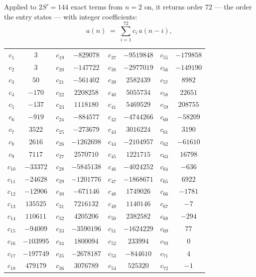 \documentclass[11pt,a4paper]{article}
\theoremstyle{plain}
\theoremstyle{definition}
\begin{document}
Applied to $2S'=144$ exact terms from $n=2$ on, it returns order $72$ --- the
order the entry states --- with integer coefficients:
\[
a(n)\;=\;\sum_{i=1}^{72}c_i\,a(n-i),
\]
\begin{center}\small
\begin{tabular}{cccccccc}
$c_{1}$ & $3$ & $c_{19}$ & $-829078$ & $c_{37}$ & $-9519848$ & $c_{55}$ & $-179858$ \\
$c_{2}$ & $3$ & $c_{20}$ & $-147722$ & $c_{38}$ & $-2977019$ & $c_{56}$ & $-149190$ \\
$c_{3}$ & $50$ & $c_{21}$ & $-561402$ & $c_{39}$ & $2582439$ & $c_{57}$ & $8982$ \\
$c_{4}$ & $-170$ & $c_{22}$ & $2208258$ & $c_{40}$ & $5055734$ & $c_{58}$ & $22651$ \\
$c_{5}$ & $-137$ & $c_{23}$ & $1118180$ & $c_{41}$ & $5469529$ & $c_{59}$ & $208755$ \\
$c_{6}$ & $-919$ & $c_{24}$ & $-884577$ & $c_{42}$ & $-4744266$ & $c_{60}$ & $-58209$ \\
$c_{7}$ & $3522$ & $c_{25}$ & $-273679$ & $c_{43}$ & $3016224$ & $c_{61}$ & $3190$ \\
$c_{8}$ & $2616$ & $c_{26}$ & $-1262698$ & $c_{44}$ & $-2104957$ & $c_{62}$ & $-61610$ \\
$c_{9}$ & $7117$ & $c_{27}$ & $2570710$ & $c_{45}$ & $1221715$ & $c_{63}$ & $16798$ \\
$c_{10}$ & $-33372$ & $c_{28}$ & $-5845138$ & $c_{46}$ & $-4024252$ & $c_{64}$ & $-636$ \\
$c_{11}$ & $-24628$ & $c_{29}$ & $-1201776$ & $c_{47}$ & $-1868671$ & $c_{65}$ & $6922$ \\
$c_{12}$ & $-12906$ & $c_{30}$ & $-671146$ & $c_{48}$ & $1749026$ & $c_{66}$ & $-1781$ \\
$c_{13}$ & $135525$ & $c_{31}$ & $7216132$ & $c_{49}$ & $1140146$ & $c_{67}$ & $-7$ \\
$c_{14}$ & $110611$ & $c_{32}$ & $4205206$ & $c_{50}$ & $2382582$ & $c_{68}$ & $-294$ \\
$c_{15}$ & $-94009$ & $c_{33}$ & $-3590196$ & $c_{51}$ & $-1624229$ & $c_{69}$ & $77$ \\
$c_{16}$ & $-103995$ & $c_{34}$ & $1800094$ & $c_{52}$ & $233994$ & $c_{70}$ & $0$ \\
$c_{17}$ & $-197749$ & $c_{35}$ & $-2678187$ & $c_{53}$ & $-844610$ & $c_{71}$ & $4$ \\
$c_{18}$ & $479179$ & $c_{36}$ & $3076789$ & $c_{54}$ & $525320$ & $c_{72}$ & $-1$ \\
\end{tabular}
\end{center}
\end{document}
